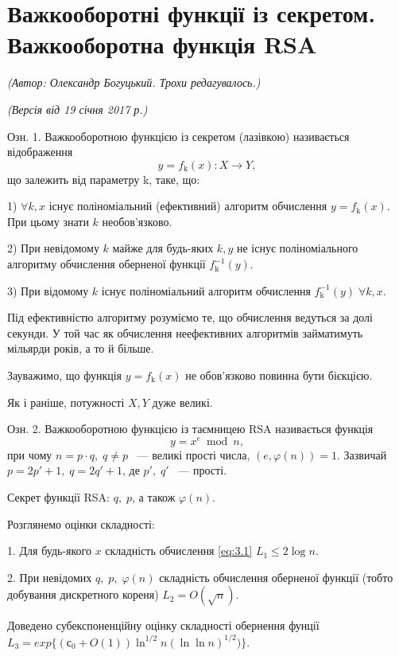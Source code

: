 \section{Важкооборотні функції із секретом. Важкооборотна функція RSA}
\begin{flushright}
\emph{(Автор: Олександр Богуцький. Трохи редагувалось.)}
\par \emph{(Версія від 19 січня 2017 р.)}
\end{flushright}

Озн. 1. Важкооборотною функцією із секретом (лазівкою) називається відображення 
\begin{equation}
y = f_{\text{k}}(x): X \rightarrow Y,
\end{equation}
що залежить від параметру k, таке, що:\par
1) $\forall k, x$ існує поліноміальний (ефективний) алгоритм обчислення $y = f_{\text{k}}(x)$. При цьому знати $k$ необов'язково.
\par2) При невідомому $k$ майже для будь-яких $k, y$ не існує поліноміального алгоритму обчислення оберненої функції $f_{\text{k}} ^{-1} (y)$.
\par3) При відомому $k$ існує поліноміальний алгоритм обчислення $f_{\text{k}} ^{-1} (y) \; \forall k, x$.

Під ефективністю алгоритму розуміємо те, що обчислення ведуться за долі секунди. У той час як обчислення неефективних алгоритмів займатимуть мільярди років, а то й більше. 

Зауважимо, що функція $y = f_{\text{k}}(x)$ не обов'язково повинна бути бієкцією.

Як і раніше, потужності $X, Y$ дуже великі.

Озн. 2. Важкооборотною функцією із таємницею RSA називається функція 
\begin{equation} \label{eq:3.1} 
y = x ^{e} \bmod n,
\end{equation}
при чому $n = p \cdot q,\; q \neq p$ ~--- великі прості числа, $(e, \varphi(n)) = 1     $. Зазвичай $p = 2p\prime + 1,\; q = 2q\prime + 1$, де $p\prime,\; q\prime$ ~--- прості.

Секрет функції RSA: $q, \; p$, а також $\varphi  (n)$.

Розглянемо оцінки складності:
\par1. Для будь-якого $x$ складність обчислення \eqref{eq:3.1} $L_{1} \leq 2 \log {n}$.
\par2. При невідомих $q, \; p,\;\varphi  (n)$ складність обчислення оберненої функції (тобто добування дискретного кореня) $L_{2} = O(\sqrt n)$.

Доведено субекспоненційну оцінку складності обернення фунції  $L_{3} = exp\{ (  \mbox{с}_{0} + O(1)) \ln ^{1/2} n (\ln\ln n) ^ {1/2}) \}$.

